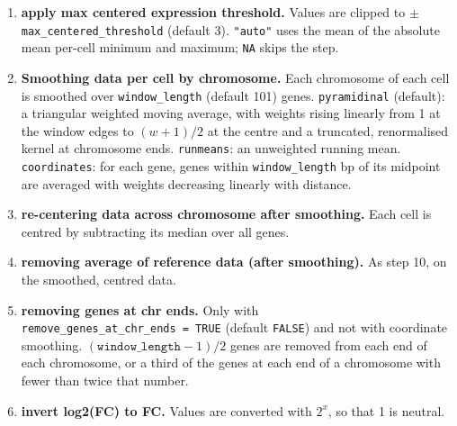 \begin{enumerate}
\item[\textbf{11}] \textbf{apply max centered expression threshold.} Values are clipped to $\pm$\texttt{max\_centered\_threshold} (default 3). \texttt{"auto"} uses the mean of the absolute mean per-cell minimum and maximum; \texttt{NA} skips the step.

\item[\textbf{12}] \textbf{Smoothing data per cell by chromosome.} Each chromosome of each cell is smoothed over \texttt{window\_length} (default 101) genes. \texttt{pyramidinal} (default): a triangular weighted moving average, with weights rising linearly from 1 at the window edges to $(w+1)/2$ at the centre and a truncated, renormalised kernel at chromosome ends. \texttt{runmeans}: an unweighted running mean. \texttt{coordinates}: for each gene, genes within \texttt{window\_length} bp of its midpoint are averaged with weights decreasing linearly with distance.

\item[\textbf{13}] \textbf{re-centering data across chromosome after smoothing.} Each cell is centred by subtracting its median over all genes.

\item[\textbf{14}] \textbf{removing average of reference data (after smoothing).} As step 10, on the smoothed, centred data.

\item[\textbf{15}] \textbf{removing genes at chr ends.} Only with \texttt{remove\_genes\_at\_chr\_ends\ =\ TRUE} (default \texttt{FALSE}) and not with coordinate smoothing. $(\texttt{window\_length}-1)/2$ genes are removed from each end of each chromosome, or a third of the genes at each end of a chromosome with fewer than twice that number.

\item[\textbf{16}] \textbf{invert log2(FC) to FC.} Values are converted with $2^x$, so that 1 is neutral.


\end{enumerate}
